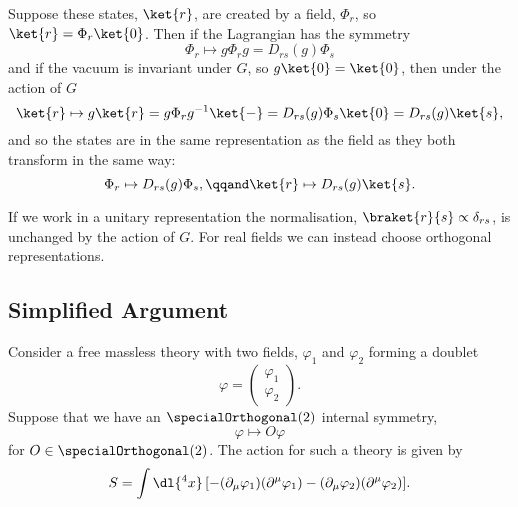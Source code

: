 \documentclass[fleqn]{NotesClass}
\begin{document}
    Suppose these states, \(\ket{r}\), are created by a field, \(\Phi_r\), so \(\ket{r} = \Phi_r\ket{0}\).
    Then if the Lagrangian has the symmetry
    \begin{equation}
        \Phi_r \mapsto g \Phi_r g = D_{rs}(g)\Phi_s
    \end{equation}
    and if the vacuum is invariant under \(G\), so \(g \ket{0} = \ket{0}\), then under the action of \(G\)
    \begin{equation}
        \ket{r} \mapsto g\ket{r} = g\Phi_r g^{-1}\ket{-} = D_{rs}(g)\Phi_s \ket{0} = D_{rs}(g)\ket{s},
    \end{equation}
    and so the states are in the same representation as the field as they both transform in the same way:
    \begin{equation}
        \Phi_r \mapsto D_{rs}(g) \Phi_s, \qqand \ket{r} \mapsto D_{rs}(g)\ket{s}.
    \end{equation}
    
    If we work in a unitary representation the normalisation, \(\braket{r}{s} \propto \delta_{rs}\), is unchanged by the action of \(G\).
    For real fields we can instead choose orthogonal representations.
    
    \subsection{Simplified Argument}
    Consider a free massless theory with two fields, \(\varphi_1\) and \(\varphi_2\) forming a doublet
    \begin{equation}
        \varphi = 
        \begin{pmatrix}
            \varphi_1\\ \varphi_2
        \end{pmatrix}
        .
    \end{equation}
    Suppose that we have an \(\specialOrthogonal(2)\) internal symmetry,
    \begin{equation}
        \varphi \mapsto O \varphi
    \end{equation}
    for \(O \in \specialOrthogonal(2)\).
    The action for such a theory is given by
    \begin{equation}
        S = \int \dl{^4x} \, [-(\partial_\mu \varphi_1)(\partial^\mu \varphi_1) - (\partial_\mu \varphi_2)(\partial^\mu \varphi_2)].
    \end{equation}
    
\end{document}
